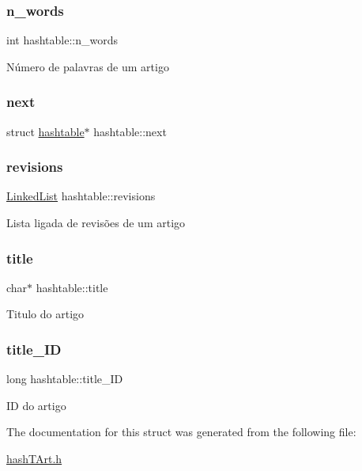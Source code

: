 \subsubsection{\texorpdfstring{n\+\_\+words}{n\_words}}
{\footnotesize\ttfamily int hashtable\+::n\+\_\+words}

Número de palavras de um artigo \mbox{\label{structhashtable_a593bc32e958ac3edc1d4a206e22deaae}} 
\subsubsection{\texorpdfstring{next}{next}}
{\footnotesize\ttfamily struct \hyperlink{structhashtable}{hashtable}$\ast$ hashtable\+::next}

\mbox{\label{structhashtable_ad58d9069aadeb6d75f42b0132febc1f0}} 
\subsubsection{\texorpdfstring{revisions}{revisions}}
{\footnotesize\ttfamily \hyperlink{linkedList_8h_a2266b5434491632a8342c9f636f413c6}{Linked\+List} hashtable\+::revisions}

Lista ligada de revisões de um artigo \mbox{\label{structhashtable_af8873f3f188208e38b53e7e2e6300dd8}} 
\subsubsection{\texorpdfstring{title}{title}}
{\footnotesize\ttfamily char$\ast$ hashtable\+::title}

Titulo do artigo \mbox{\label{structhashtable_ad7b7b127285f3ca33a30124b71a9c948}} 
\subsubsection{\texorpdfstring{title\+\_\+\+ID}{title\_ID}}
{\footnotesize\ttfamily long hashtable\+::title\+\_\+\+ID}

ID do artigo 

The documentation for this struct was generated from the following file\+:\begin{DoxyCompactItemize}
\item 
\hyperlink{hashTArt_8h}{hash\+T\+Art.\+h}\end{DoxyCompactItemize}
